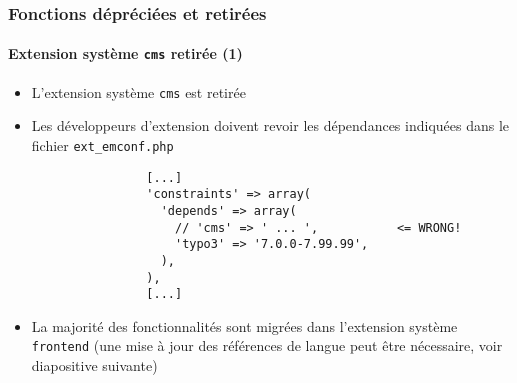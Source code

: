 \begin{frame}[fragile]
	\frametitle{Fonctions dépréciées et retirées}
	\framesubtitle{Extension système \texttt{cms} retirée (1)}

	\lstset{basicstyle=\tiny\ttfamily}

	\begin{itemize}

		\item L'extension système \texttt{cms} est retirée

		\item Les développeurs d'extension doivent revoir les dépendances indiquées dans le fichier \texttt{ext\_emconf.php}

			\begin{lstlisting}
				[...]
				'constraints' => array(
				  'depends' => array(
				    // 'cms' => ' ... ',           <= WRONG!
				    'typo3' => '7.0.0-7.99.99',
				  ),
				),
				[...]
			\end{lstlisting}

		\item La majorité des fonctionnalités sont migrées dans l'extension système \texttt{frontend}
			(une mise à jour des références de langue peut être nécessaire, voir diapositive suivante)

	\end{itemize}

\end{frame}


